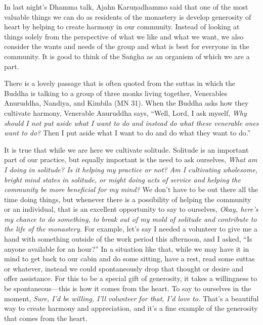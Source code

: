 
In last night's Dhamma talk, Ajahn Karuṇadhammo said that one of the 
most valuable things we can do as residents of the monastery is develop 
generosity of heart by helping to create harmony in our community. 
Instead of looking at things solely from the perspective of what we 
like and what we want, we also consider the wants and needs of the 
group and what is best for everyone in the community. It is good to 
think of the Saṅgha as an organism of which we are a part.

There is a lovely passage that is often quoted from the suttas in which 
the Buddha is talking to a group of three monks living together, 
Venerables Anuruddha, Nandiya, and Kimbila (MN 31). When the Buddha 
asks how they cultivate harmony, Venerable Anuruddha says, ``Well, 
Lord, I ask myself, \emph{Why should I not put aside what I want to do 
and instead do what these venerable ones want to do?} Then I put aside 
what I want to do and do what they want to do.''

It is true that while we are here we cultivate solitude. Solitude is an 
important part of our practice, but equally important is the need to 
ask ourselves, \emph{What am I doing in solitude? Is it helping my 
practice or not? Am I cultivating wholesome, bright mind states in 
solitude, or might doing acts of service and helping the community be 
more beneficial for my mind?} We don't have to be out there all the 
time doing things, but whenever there is a possibility of helping the 
community or an individual, that is an excellent opportunity to say to 
ourselves, \emph{Okay, here's my chance to do something, to break out 
of my mold of solitude and contribute to the life of the monastery.} 
For example, let's say I needed a volunteer to give me a hand with 
something outside of the work period this afternoon, and I asked, ``Is 
anyone available for an hour?'' In a situation like that, while we may 
have it in mind to get back to our cabin and do some sitting, have a 
rest, read some suttas or whatever, instead we could spontaneously drop 
that thought or desire and offer assistance. For this to be a special 
gift of generosity, it takes a willingness to be spontaneous---this is 
how it comes from the heart. To say to ourselves in the moment, 
\emph{Sure, I'd be willing, I'll volunteer for that, I'd love to.} 
That's a beautiful way to create harmony and appreciation, and it's a 
fine example of the generosity that comes from the heart.

